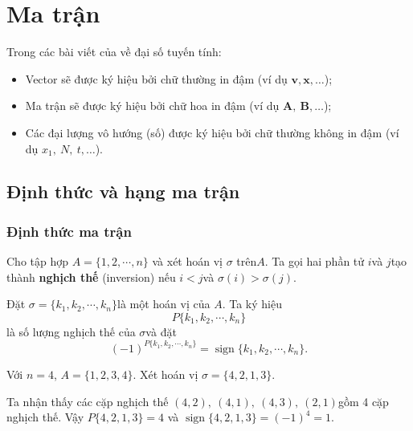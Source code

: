 \documentclass{mynotes}
\DeclareMathOperator{\sign}{sign}
\begin{document}


\tableofcontents

\chapter{Ma trận}

Trong các bài viết của về đại số tuyến tính:

\begin{itemize}
    \item Vector sẽ được ký hiệu bởi chữ thường in đậm (ví dụ $\bm{v}, \bm{x}, \ldots$)​; 
    \item Ma trận sẽ được ký hiệu bởi chữ hoa in đậm (ví dụ $\bm{A},\ \bm{B}, \ldots$​);
    \item Các đại lượng vô hướng (số) được ký hiệu bởi chữ thường không in đậm (ví dụ $x_1,\ N,\ t, \ldots$).
\end{itemize}

\section{Định thức và hạng ma trận}

\subsection*{Định thức ma trận}

\begin{definition}
    Cho tập hợp $A = \{1, 2, \cdots, n\}$ và xét hoán vị $\sigma$ trên ​$A$. Ta gọi hai phần tử $i$​ và $j$​ tạo thành \textbf{nghịch thế} (inversion) nếu $i < j$​ và $\sigma(i) > \sigma(j)$.

    Đặt $\sigma = \{k_1, k_2, \cdots, k_n\}$​ là một hoán vị của $A$​. Ta ký hiệu \[ P\{k_1, k_2, \cdots, k_n\} \] là số lượng nghịch thế của $\sigma$​ và đặt \[ (-1)^{P\{k_1, k_2, \cdots, k_n\}} = \sign \{k_1, k_2, \cdots, k_n\}. \]
\end{definition}

\begin{example}
    Với $n=4$​, $A = \{1, 2, 3, 4\}$​. Xét hoán vị $\sigma = \{4, 2, 1, 3\}$.

    Ta nhận thấy các cặp nghịch thế $(4, 2),\ (4, 1),\ (4, 3),\ (2, 1)$​ gồm 4 cặp nghịch thế. Vậy $P\{4, 2, 1, 3\} = 4$ và $\sign \{4, 2, 1, 3\}=(-1)^4=1$​.
\end{example}
\end{document}
